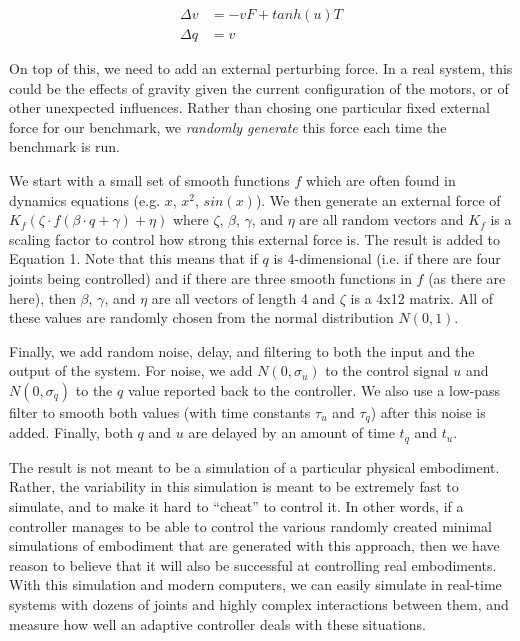 \documentclass{frontiersSCNS} %
\begin{document}
\begin{align}
    \Delta v & =  -v F + tanh(u)T \\
    \Delta q & = v
\end{align}

On top of this, we need to add an external perturbing force.  In a real system,
this could be the effects of gravity given the current configuration of the
motors, or of other unexpected influences.  
Rather than chosing one particular fixed external force for our benchmark,
we \emph{randomly generate} this force each time the benchmark is run.  

We start with a small set of
smooth functions $f$ which are often found in dynamics equations (e.g. $x$, $x^2$,
$sin(x)$).  We then generate an external force of $K_f (\zeta \cdot f(\beta \cdot q + \gamma) + \eta)$
where $\zeta$, $\beta$, $\gamma$, and $\eta$ are all random vectors and
$K_f$ is a scaling factor to control how strong this external force is.  The
result is added to Equation 1.  Note that this means that if $q$ is 4-dimensional
(i.e. if there are four joints being controlled) and if there are three smooth
functions in $f$ (as there are here), then $\beta$, $\gamma$, and $\eta$ are 
all vectors of length 4 and $\zeta$ is a 4x12 matrix.  All of these values are
randomly chosen from the normal distribution $N(0,1)$.

Finally, we add random noise, delay, and filtering to both the input and the
output of the system.  For noise, we add $N(0,\sigma_u)$ to the control signal
$u$ and $N(0,\sigma_q)$ to the $q$ value reported back to the controller.  We
also use a low-pass filter to smooth both values (with time constants $\tau_u$
and $\tau_q$) after this noise is added.  Finally, both $q$ and $u$ are delayed
by an amount of time $t_q$ and $t_u$.

The result is not meant to be a simulation of a particular physical embodiment.
Rather, the variability in this simulation is meant to be extremely fast
to simulate, and to make it hard to ``cheat''
to control it.  In other words, if a controller manages to be able to control
the various randomly created minimal simulations of embodiment that are
generated with this approach, then we have reason to believe that it will also
be successful at controlling real embodiments.  With this simulation and
modern computers, we can easily simulate in real-time systems with dozens of joints and
highly complex interactions between them, and measure how well an adaptive
controller deals with these situations.
\end{document}
